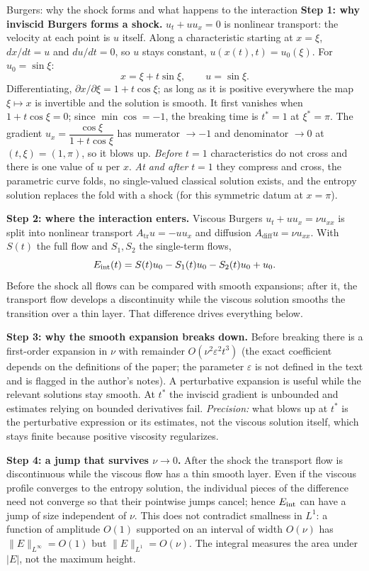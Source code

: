 \begin{explained}{Burgers: why the shock forms and what happens to the interaction}
\textbf{Step 1: why inviscid Burgers forms a shock.} $u_t+uu_x=0$ is nonlinear transport: the velocity at each point is $u$ itself. Along a characteristic starting at $x=\xi$, $dx/dt=u$ and $du/dt=0$, so $u$ stays constant, $u(x(t),t)=u_0(\xi)$. For $u_0=\sin\xi$:
\[
x=\xi+t\sin\xi,\qquad u=\sin\xi .
\]
Differentiating, $\partial x/\partial\xi=1+t\cos\xi$; as long as it is positive everywhere the map $\xi\mapsto x$ is invertible and the solution is smooth. It first vanishes when $1+t\cos\xi=0$; since $\min\cos=-1$, the breaking time is $t^*=1$ at $\xi^*=\pi$. The gradient $u_x=\dfrac{\cos\xi}{1+t\cos\xi}$ has numerator $\to-1$ and denominator $\to0$ at $(t,\xi)=(1,\pi)$, so it blows up. \emph{Before $t=1$} characteristics do not cross and there is one value of $u$ per $x$. \emph{At and after} $t=1$ they compress and cross, the parametric curve folds, no single-valued classical solution exists, and the entropy solution replaces the fold with a shock (for this symmetric datum at $x=\pi$).

\medskip\textbf{Step 2: where the interaction enters.} Viscous Burgers $u_t+uu_x=\nu u_{xx}$ is split into nonlinear transport $A_{\mathrm{tr}}u=-uu_x$ and diffusion $A_{\mathrm{diff}}u=\nu u_{xx}$. With $S(t)$ the full flow and $S_1,S_2$ the single-term flows,
\[
E_{\mathrm{int}}(t)=S(t)u_0-S_1(t)u_0-S_2(t)u_0+u_0 .
\]
Before the shock all flows can be compared with smooth expansions; after it, the transport flow develops a discontinuity while the viscous solution smooths the transition over a thin layer. That difference drives everything below.

\medskip\textbf{Step 3: why the smooth expansion breaks down.} Before breaking there is a first-order expansion in $\nu$ with remainder $O(\nu^2\varepsilon^2t^3)$ (the exact coefficient depends on the definitions of the paper; the parameter $\varepsilon$ is not defined in the text and is flagged in the author's notes). A perturbative expansion is useful while the relevant solutions stay smooth. At $t^*$ the inviscid gradient is unbounded and estimates relying on bounded derivatives fail. \emph{Precision:} what blows up at $t^*$ is the perturbative expression or its estimates, not the viscous solution itself, which stays finite because positive viscosity regularizes.

\medskip\textbf{Step 4: a jump that survives $\nu\to0$.} After the shock the transport flow is discontinuous while the viscous flow has a thin smooth layer. Even if the viscous profile converges to the entropy solution, the individual pieces of the difference need not converge so that their pointwise jumps cancel; hence $E_{\mathrm{int}}$ can have a jump of size independent of $\nu$. This does not contradict smallness in $L^1$: a function of amplitude $O(1)$ supported on an interval of width $O(\nu)$ has $\|E\|_{L^\infty}=O(1)$ but $\|E\|_{L^1}=O(\nu)$. The integral measures the area under $|E|$, not the maximum height.


\end{explained}
